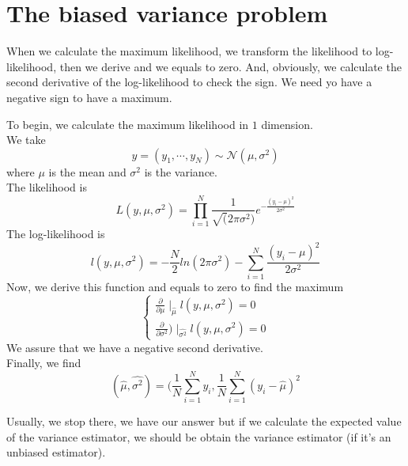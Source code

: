 \documentclass{article}
\begin{document}

\section{The biased variance problem}
When we calculate the maximum likelihood, we transform the likelihood to log-likelihood, then we derive and we equals to zero. And, obviously, we calculate the second derivative of the log-likelihood to check the sign. We need yo have a negative sign to have a maximum.\\
\begin{exemple}
To begin, we calculate the maximum likelihood in $1$ dimension.\\
We take
\[ y = (y_1, \cdots, y_N) \sim \mathcal{N}(\mu, \sigma^2) \]
where $\mu$ is the mean and $\sigma^2$ is the variance.\\
The likelihood is \[ L(y, \mu, \sigma^2) = \prod_{i=1}^N \frac{1}{\sqrt(2\pi \sigma^2)}e^{-\frac{(y_i-\mu)^2}{2\sigma^2}} \]
The log-likelihood is \[l(y, \mu, \sigma^2) = -\frac{N}{2}ln(2\pi\sigma^2)-\sum_{i=1}^N\frac{(y_i-\mu)^2}{2\sigma^2}\]
Now, we derive this function and equals to zero to find the maximum
\begin{equation*}
    \begin{cases}
        \frac{\partial}{\partial \mu}\mid_{\hat{\mu}}l(y, \mu, \sigma^2) = 0 \\
        \frac{\partial}{\partial \sigma^2})\mid_{\hat{\sigma^2}}l(y, \mu, \sigma^2) = 0
    \end{cases}
\end{equation*}
We assure that we have a negative second derivative.\\
Finally, we find \[ (\hat{\mu}, \hat{\sigma^2}) = (\frac{1}{N} \sum_{i=1}^N y_i, \frac{1}{N} \sum_{i=1}^N(y_i-\hat{\mu})^2\]
\end{exemple}
Usually, we stop there, we have our answer but if we calculate the expected value of the variance estimator, we should be obtain the variance estimator (if it's an unbiased estimator).\\
\end{document}
